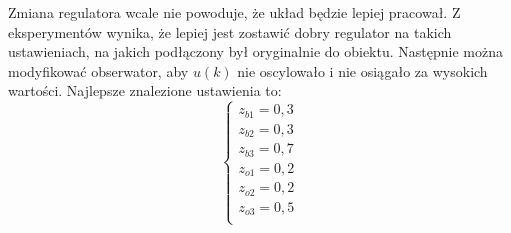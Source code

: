 Zmiana regulatora wcale nie powoduje, że układ będzie lepiej pracował. 
Z eksperymentów wynika, że lepiej jest zostawić dobry regulator na takich ustawieniach, na jakich podłączony był oryginalnie do obiektu.
Następnie można modyfikować obserwator, aby $u(k)$ nie oscylowało i nie osiągało za wysokich wartości. Najlepsze znalezione ustawienia to:
\[
 \left\{
 \begin{array}{l}
 z_{b1}=0,3	\\
 z_{b2}=0,3	\\
 z_{b3}=0,7	\\
 z_{o1}=0,2	\\
 z_{o2}=0,2	\\
 z_{o3}=0,5	\\
 \end{array}
 \right.
\]
